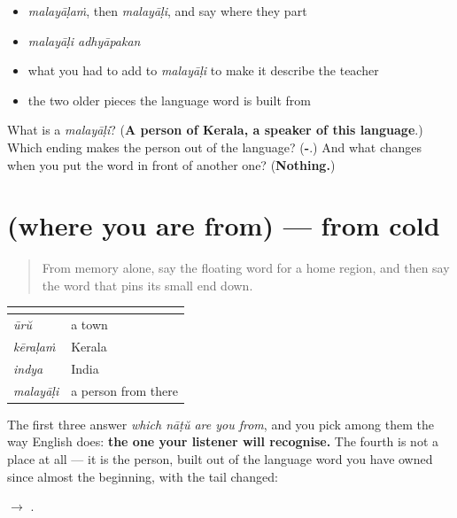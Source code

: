 \begin{itemize}
\raggedright
  \item \emph{malayāḷaṁ}, then \emph{malayāḷi}, and say where they part
  \item \emph{malayāḷi adhyāpakan}
  \item what you had to add to \emph{malayāḷi} to make it describe the teacher
  \item the two older pieces the language word is built from
\end{itemize}

\begin{tcolorbox}[breakable,colback=teal!4,colframe=teal!35!black,title={Before you move on}]
What is a \emph{malayāḷi}? (\textbf{A person of Kerala, a speaker of this language}.) Which ending makes the person out of the language? (\textbf{-}.) And what changes when you put the word in front of another one? (\textbf{Nothing.})
\end{tcolorbox}
\section[(where you are from)]{(where you are from) — from cold}

\label{lesson:ML-R80-origin-recall}



\begin{quote}
From memory alone, say the floating word for a home region, and then say the word that pins its small end down.
\end{quote}

\begin{grammarlens}[title={Grammar Lens: a scale, and a person on it}]
\noindent
\begin{tabularx}{\linewidth}{@{}>{\raggedright\arraybackslash}X>{\raggedright\arraybackslash}X@{}}
\toprule
\textbf{} & \textbf{} \\
\midrule
\textbf{\ml{ഊര്}} \emph{ūrŭ} & a town \\
\textbf{\ml{കേരളം}} \emph{kēraḷaṁ} & Kerala \\
\textbf{\ml{ഇന്ത്യ}} \emph{indya} & India \\
\textbf{\ml{മലയാളി}} \emph{malayāḷi} & a person from there \\
\bottomrule
\end{tabularx}

The first three answer \emph{which nāṭŭ are you from}, and you pick among them the way English does: \textbf{the one your listener will recognise.} The fourth is not a place at all — it is the person, built out of the language word you have owned since almost the beginning, with the tail changed:

\textbf{} $\to$ \textbf{}.
\end{grammarlens}

